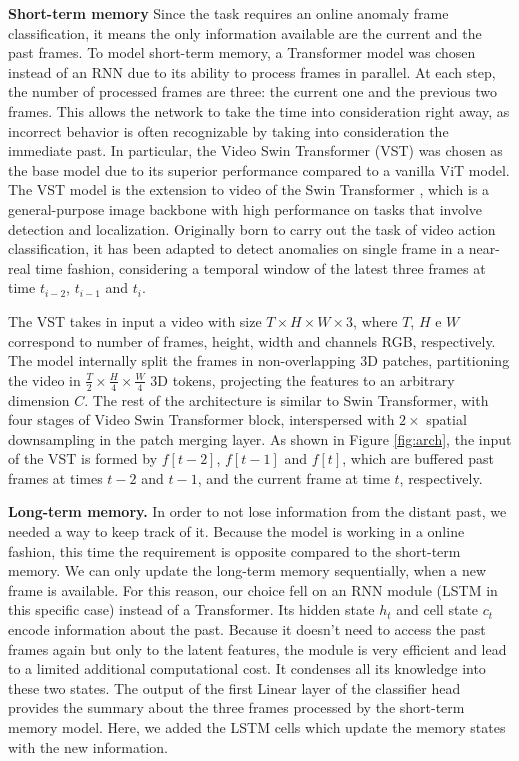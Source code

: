 \noindent\textbf{Short-term memory}
Since the task requires an online anomaly frame classification, it means the only information available are the current and the past frames.
To model short-term memory, a Transformer model was chosen instead of an RNN due to its ability to process frames in parallel.
At each step, the number of processed frames are three: the current one and the previous two frames. 
This allows the network to take the time into consideration right away, as incorrect behavior is often recognizable by taking into consideration the immediate past.
In particular, the Video Swin Transformer (VST) \cite{liu_video_2022} was chosen as the base model due to its superior performance compared to a vanilla ViT \cite{DBLP:conf/iclr/DosovitskiyB0WZ21} model.
The VST model is the extension to video of the Swin Transformer \cite{liu2021Swin}, which is a general-purpose image backbone with high performance on tasks that involve detection and localization.
Originally born to carry out the task of video action classification, it has been adapted to detect anomalies on single frame in a near-real time fashion, considering a temporal window of the latest three frames at time $t_{i-2}$, $t_{i-1}$ and $t_{i}$.

The VST takes in input a video with size $T \times H \times W \times 3$, where $T$, $H$ e $W$ correspond to number of frames, height, width and channels RGB, respectively.
The model internally split the frames in non-overlapping 3D patches, partitioning the video in $\frac{T}{2} \times \frac{H}{4} \times \frac{W}{4}$ 3D tokens, projecting the features to an arbitrary dimension $C$.
The rest of the architecture is similar to Swin Transformer, with four stages of Video Swin Transformer block, interspersed with $2\times$ spatial downsampling in the patch merging layer.
As shown in Figure \ref{fig:arch}, the input of the VST is formed by $f[t-2]$, $f[t-1]$ and $f[t]$, which are buffered past frames at times $t-2$ and $t-1$, and the current frame at time $t$, respectively.

\noindent\textbf{Long-term memory.}
In order to not lose information from the distant past, we needed a way to keep track of it.
Because the model is working in a online fashion, this time the requirement is opposite compared to the short-term memory.
We can only update the long-term memory sequentially, when a new frame is available.
For this reason, our choice fell on an RNN module (LSTM in this specific case) instead of a Transformer.
Its hidden state $h_t$ and cell state $c_t$ encode information about the past.
Because it doesn't need to access the past frames again but only to the latent features, the module is very efficient and lead to a limited additional computational cost.
It condenses all its knowledge into these two states.
The output of the first Linear layer of the classifier head provides the summary about the three frames processed by the short-term memory model.
Here, we added the LSTM cells which update the memory states with the new information.


